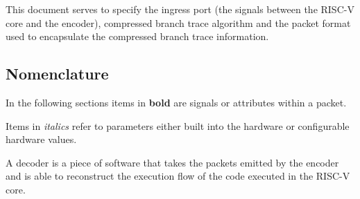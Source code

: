 This document serves to specify the ingress port (the signals between
the RISC-V core and the encoder), compressed branch trace algorithm and
the packet format used to encapsulate the compressed branch trace
information.

\subsection{Nomenclature}

In the following sections items in \textbf{bold} are signals or
attributes within a packet.

Items in \textit {italics} refer to parameters either built into the
hardware or configurable hardware values.

A decoder is a piece of software that takes the packets emitted by the
encoder and is able to reconstruct the execution flow of the code
executed in the RISC-V core.
